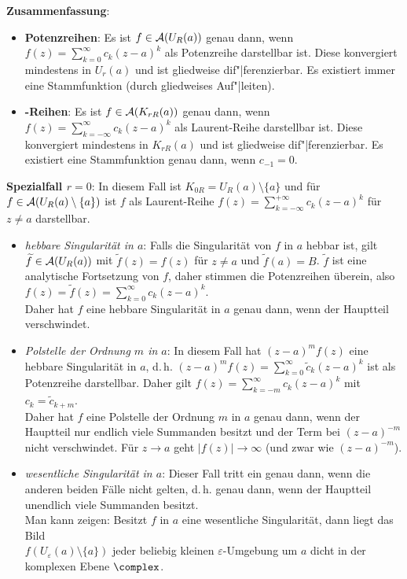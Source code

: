 \textbf{Zusammenfassung}:
\begin{itemize}
    \item
    \textbf{Potenzreihen}:
    Es ist $f \in \mathcal{A}(U_R(a))$ genau dann, wenn
    $f(z) = \sum_{k=0}^\infty c_k (z - a)^k$ als Potenzreihe darstellbar ist.
    Diese konvergiert mindestens in $U_r(a)$ und ist gliedweise
    dif"|ferenzierbar.
    Es existiert immer eine Stammfunktion (durch gliedweises Auf"|leiten).

    \item
    \textbf{-Reihen}:
    Es ist $f \in \mathcal{A}(K_{rR}(a))$ genau dann, wenn
    $f(z) = \sum_{k=-\infty}^\infty c_k (z - a)^k$ als
    Laurent-Reihe darstellbar ist.
    Diese konvergiert mindestens in $K_{rR}(a)$ und ist gliedweise
    dif"|ferenzierbar.
    Es existiert eine Stammfunktion genau dann, wenn $c_{-1} = 0$.
\end{itemize}

\linie

\textbf{Spezialfall $r = 0$}:
In diesem Fall ist $K_{0R} = U_R(a) \setminus \{a\}$
und für $f \in \mathcal{A}(U_R(a) \setminus \{a\})$ ist $f$ als Laurent-Reihe
$f(z) = \sum_{k=-\infty}^{+\infty} c_k (z - a)^k$ für $z \not= a$ darstellbar.
\begin{itemize}
    \item
    \emph{hebbare Singularität in $a$}:
    Falls die Singularität von $f$ in $a$ hebbar ist,
    gilt $\widetilde{f} \in \mathcal{A}(U_R(a))$ mit
    $\widetilde{f}(z) = f(z)$ für $z \not= a$ und $\widetilde{f}(a) = B$.
    $\widetilde{f}$ ist eine analytische Fortsetzung von $f$, daher stimmen
    die Potenzreihen überein, also
    $f(z) = \widetilde{f}(z) = \sum_{k=0}^\infty c_k (z - a)^k$.\\
    Daher hat $f$ eine hebbare Singularität in $a$ genau dann, wenn der
    Hauptteil verschwindet.

    \item
    \emph{Polstelle der Ordnung $m$ in $a$}:
    In diesem Fall hat $(z - a)^m f(z)$ eine hebbare Singularität in $a$,
    d.\,h. $(z - a)^m f(z) = \sum_{k=0}^\infty \widetilde{c}_k (z - a)^k$
    ist als Potenzreihe darstellbar.
    Daher gilt $f(z) = \sum_{k=-m}^\infty c_k (z - a)^k$ mit
    $c_k = \widetilde{c}_{k+m}$.\\
    Daher hat $f$ eine Polstelle der Ordnung $m$ in $a$ genau dann, wenn der
    Hauptteil nur endlich viele Summanden besitzt und der Term bei
    $(z - a)^{-m}$ nicht verschwindet.
    Für $z \to a$ geht $|f(z)| \to \infty$ (und zwar wie $(z - a)^{-m}$).

    \item
    \emph{wesentliche Singularität in $a$}:
    Dieser Fall tritt ein genau dann, wenn die anderen beiden Fälle nicht
    gelten, d.\,h. genau dann, wenn
    der Hauptteil unendlich viele Summanden besitzt.\\
    Man kann zeigen:
    Besitzt $f$ in $a$ eine wesentliche Singularität, dann liegt das Bild\\
    $f(U_\varepsilon(a) \setminus \{a\})$ jeder beliebig kleinen
    $\varepsilon$-Umgebung um $a$ dicht in der komplexen Ebene $\complex$.
\end{itemize}

